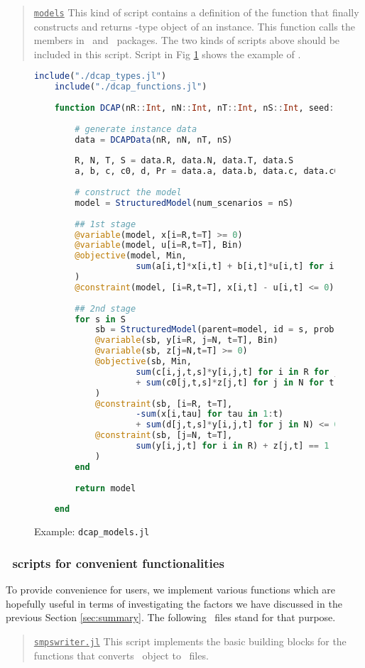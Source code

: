 \begin{quote}
\noindent\underline{\texttt{models}} This kind of script contains a definition of the function that finally constructs and returns \jumpmodel-type object of an instance. This function calls the members in \jump\ and \structjump\ packages. The two kinds of scripts above should be included in this script. Script in Fig \ref{fig:dcap_models} shows the example of \dcap.
\end{quote}
\begin{figure}[H]
	\centering
	\begin{lstlisting}[frame=single,language=julia]
	include("./dcap_types.jl")
	include("./dcap_functions.jl")
	
	function DCAP(nR::Int, nN::Int, nT::Int, nS::Int, seed::Int)::JuMP.Model
	
		# generate instance data
		data = DCAPData(nR, nN, nT, nS)
		
		R, N, T, S = data.R, data.N, data.T, data.S
		a, b, c, c0, d, Pr = data.a, data.b, data.c, data.c0, data.d, data.Pr
		
		# construct the model
		model = StructuredModel(num_scenarios = nS)
		
		## 1st stage
		@variable(model, x[i=R,t=T] >= 0)
		@variable(model, u[i=R,t=T], Bin)
		@objective(model, Min, 
					sum(a[i,t]*x[i,t] + b[i,t]*u[i,t] for i in R for t in T)
		)
		@constraint(model, [i=R,t=T], x[i,t] - u[i,t] <= 0)
		
		## 2nd stage
		for s in S
			sb = StructuredModel(parent=model, id = s, prob = Pr[s])
			@variable(sb, y[i=R, j=N, t=T], Bin)
			@variable(sb, z[j=N,t=T] >= 0)
			@objective(sb, Min, 
					sum(c[i,j,t,s]*y[i,j,t] for i in R for j in N for t in T) 
					+ sum(c0[j,t,s]*z[j,t] for j in N for t in T)
			)
			@constraint(sb, [i=R, t=T], 
					-sum(x[i,tau] for tau in 1:t) 
					+ sum(d[j,t,s]*y[i,j,t] for j in N) <= 0)
			@constraint(sb, [j=N, t=T], 
					sum(y[i,j,t] for i in R) + z[j,t] == 1
			)
		end
	
		return model
		
	end
	\end{lstlisting}
	\caption{Example: \texttt{dcap\_models.jl}}\label{fig:dcap_models}
\end{figure}

\subsubsection{\julia\ scripts for convenient functionalities}
To provide convenience for users, we implement various functions which are hopefully useful in terms of investigating the factors we have discussed in the previous Section \ref{sec:summary}. The following \julia\ files stand for that purpose.
\begin{quotation}
	\noindent\underline{\texttt{smpswriter.jl}} This script implements the basic building blocks for the functions that converts \jumpmodel\ object to \smps\ files. 
\end{quotation}

